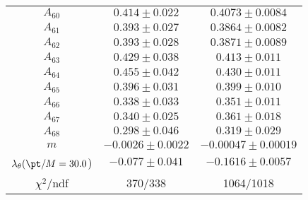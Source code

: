 \begin{tabular}{c|c|c}
$A_60$ & $0.414\pm0.022$ & $0.4073\pm0.0084$ \\
$A_61$ & $0.393\pm0.027$ & $0.3864\pm0.0082$ \\
$A_62$ & $0.393\pm0.028$ & $0.3871\pm0.0089$ \\
$A_63$ & $0.429\pm0.038$ & $0.413\pm0.011$ \\
$A_64$ & $0.455\pm0.042$ & $0.430\pm0.011$ \\
$A_65$ & $0.396\pm0.031$ & $0.399\pm0.010$ \\
$A_66$ & $0.338\pm0.033$ & $0.351\pm0.011$ \\
$A_67$ & $0.340\pm0.025$ & $0.361\pm0.018$ \\
$A_68$ & $0.298\pm0.046$ & $0.319\pm0.029$ \\
$m$ & $-0.0026\pm0.0022$ & $-0.00047\pm0.00019$ \\
$\lambda_\theta(\pt/M = 30.0$) & $-0.077\pm0.041$ & $-0.1616\pm0.0057$ \\
\hline
$\chi^2$/ndf & 370/338 & 1064/1018
\end{tabular}
